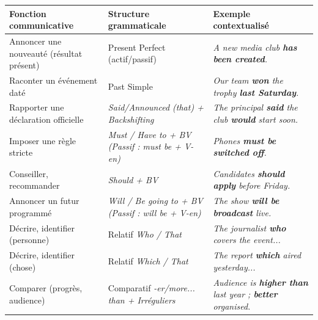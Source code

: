 \documentclass[11pt]{article}
\newcommand{\eng}[1]{\ifmmode\text{\textit{#1}}\else\begingroup\selectlanguage{english}\itshape #1\endgroup\fi}
\begin{document}
\begin{propriete}
\begin{center}
\begin{tabularx}{\linewidth}{|X|X|X|}
\hline
\rowcolor{popblueL} Fonction communicative & Structure grammaticale & Exemple contextualisé \\
\hline
Annoncer une nouveauté (résultat présent) & Present Perfect (actif/passif) & \eng{A new media club \textbf{has been created}.} \\
\hline
Raconter un événement daté & Past Simple & \eng{Our team \textbf{won} the trophy \textbf{last Saturday}.} \\
\hline
Rapporter une déclaration officielle & \eng{Said/Announced (that) + Backshifting} & \eng{The principal \textbf{said} the club \textbf{would} start soon.} \\
\hline
Imposer une règle stricte & \eng{Must / Have to + BV} (Passif : \eng{must be + V-en}) & \eng{Phones \textbf{must be switched off}.} \\
\hline
Conseiller, recommander & \eng{Should + BV} & \eng{Candidates \textbf{should apply} before Friday.} \\
\hline
Annoncer un futur programmé & \eng{Will / Be going to + BV} (Passif : \eng{will be + V-en}) & \eng{The show \textbf{will be broadcast} live.} \\
\hline
Décrire, identifier (personne) & Relatif \eng{Who / That} & \eng{The journalist \textbf{who} covers the event...} \\
\hline
Décrire, identifier (chose) & Relatif \eng{Which / That} & \eng{The report \textbf{which} aired yesterday...} \\
\hline
Comparer (progrès, audience) & Comparatif \eng{-er/more... than} + Irréguliers & \eng{Audience is \textbf{higher than} last year ; \textbf{better} organised.} \\
\hline
\end{tabularx}
\end{center}
\end{propriete}
\end{document}
